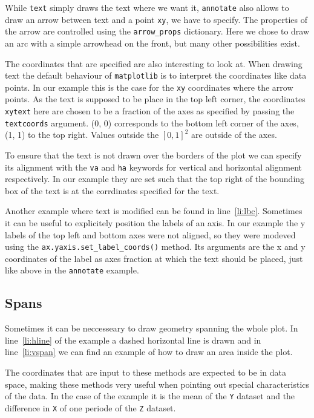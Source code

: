\documentclass[a4paper, 11pt, onecolumn]{article}
\newcommand{\mpl}{\texttt{matplotlib}\xspace}
\newcommand{\pl}[1]{\mbox{\texttt{#1}\xspace}}
\newcommand{\baseref}[3]{\mbox{#1 \ref{#2:#3}\xspace}}
\newcommand{\lin}[1]{\baseref{line}{li}{#1}}
\begin{document}
While \pl{text} simply draws the text where we want it, \pl{annotate} also
allows to draw an arrow between text and a point \pl{xy}, we have to specify.
The properties of the arrow are controlled using the \pl{arrow\_props}
dictionary. Here we chose to draw an arc with a simple arrowhead on the front,
but many other possibilities exist.

The coordinates that are specified are also interesting to look at. When
drawing text the default behaviour of \mpl is to interpret the coordinates like
data points. In our example this is the case for the \pl{xy} coordinates where
the arrow points. As the text is supposed to be place in the top left corner,
the coordinates \pl{xytext} here are chosen to be a fraction of the axes as
specified by passing the \pl{textcoords} argument. (0, 0) corresponds to the
bottom left corner of the axes, (1, 1) to the top right. Values outside the
$[0, 1]^2$ are outside of the axes.

To ensure that the text is not drawn over the borders of the plot we can
specify its alignment with the \pl{va} and \pl{ha} keywords for vertical and
horizontal alignment respectively. In our example they are set such that the 
top right of the bounding box of the text is at the corrdinates specified for 
the text.

Another example where text is modified can be found in \lin{lbc}.
Sometimes it can be useful to explicitely position the labels of an axis. In
our example the y labels of the top left and bottom axes were not aligned, so
they were modeved using the \pl{ax.yaxis.set\_label\_coords()} method. Its
arguments are the x and y coordinates of the label as axes fraction at which
the text should be placed, just like above in the \pl{annotate} example.


\subsection{Spans}

Sometimes it can be neccesseary to draw geometry spanning the whole plot.
In \lin{hline} of the example a dashed horizontal line is drawn and in
\lin{vspan} we can find an example of how to draw an area inside the plot.

The coordinates that are input to these methods are expected to be in data
space, making these methods very useful when pointing out special
characteristics of the data. In the case of the example it is the mean of
the \pl{Y} dataset and the difference in \pl{X} of one periode of the \pl{Z}
dataset.
\end{document}
